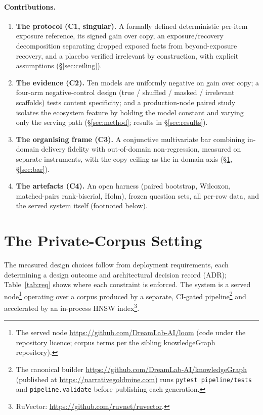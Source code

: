 \documentclass[10pt,twocolumn]{article}
\begin{document}
\paragraph{Contributions.}
\begin{enumerate}[topsep=2pt,itemsep=1pt]
\item \textbf{The protocol (C1, singular).} A formally defined deterministic per-item exposure reference, its signed gain over copy, an exposure/recovery decomposition separating dropped exposed facts from beyond-exposure recovery, and a placebo verified irrelevant by construction, with explicit assumptions (\S\ref{sec:ceiling}).
\item \textbf{The evidence (C2).} Ten models are uniformly negative on gain over copy; a four-arm
negative-control design (true / shuffled / masked / irrelevant scaffolds) tests content specificity;
and a production-node paired study isolates the ecosystem feature by holding the model constant and
varying only the serving path (\S\ref{sec:method}; results in \S\ref{sec:results}).
\item \textbf{The organising frame (C3).} A conjunctive multivariate bar combining in-domain delivery
fidelity with out-of-domain non-regression, measured on separate instruments, with the copy ceiling
as the in-domain axis (\S\ref{sec:setting}, \S\ref{sec:bar}).
\item \textbf{The artefacts (C4).} An open harness (paired bootstrap, Wilcoxon, matched-pairs
rank-biserial, Holm), frozen question sets, all per-row data, and the served system
itself (footnoted below).
\end{enumerate}


\section{The Private-Corpus Setting}\label{sec:setting}
The measured design choices follow from deployment requirements, each determining a design outcome and architectural decision record (ADR); Table~\ref{tab:req} shows where each constraint is enforced. The system is a served node\footnote{The served node \url{https://github.com/DreamLab-AI/loom} (code under the repository licence; corpus terms per the sibling knowledgeGraph repository).} operating over a corpus produced by a separate, CI-gated pipeline\footnote{The canonical builder \url{https://github.com/DreamLab-AI/knowledgeGraph} (published at \url{https://narrativegoldmine.com}) runs \texttt{pytest pipeline/tests} and \texttt{pipeline.validate} before publishing each generation.} and accelerated by an in-process HNSW index\footnote{RuVector: \url{https://github.com/ruvnet/ruvector}.}.
\end{document}
